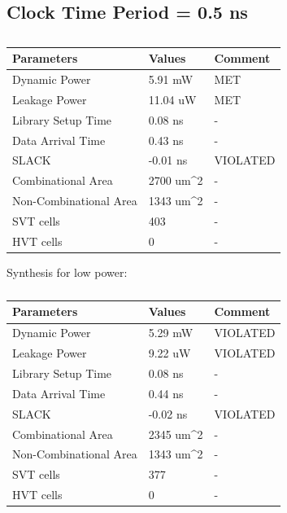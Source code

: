 \documentclass[11pt,a4paper]{article}
\begin{document}
\newpage
\subsection{Clock Time Period = 0.5 ns}
\begin{table}[htbp]
\begin{center}
\begin{tabular}{|l|l|l|}
\hline
\textbf{Parameters}	& \textbf{Values}		& \textbf{Comment}\\ \hline
Dynamic Power				&	5.91 mW				& MET\\ \hline
Leakage Power 			&	11.04 uW			& MET\\ \hline
Library Setup Time  & 0.08 ns				& - \\ \hline
Data Arrival Time		& 0.43 ns				& - \\ \hline
SLACK								& -0.01 ns			& VIOLATED \\ \hline
Combinational Area	& 2700 um^2			& - \\ \hline
Non-Combinational Area	& 1343 um^2	& - \\ \hline
SVT cells						& 403						& - \\ \hline
HVT cells						& 0							& - \\ \hline
\end{tabular}
\end{center}
\caption{}
\label{tab:syn0.5.1}
\end{table}

Synthesis for low power:

\begin{table}[htbp]
\begin{center}
\begin{tabular}{|l|l|l|}
\hline
\textbf{Parameters}	& \textbf{Values}		& \textbf{Comment}\\ \hline
Dynamic Power				&	5.29 mW				& VIOLATED\\ \hline
Leakage Power 			&	9.22 uW				& VIOLATED\\ \hline
Library Setup Time  & 0.08 ns				& - \\ \hline
Data Arrival Time		& 0.44 ns				& - \\ \hline
SLACK								& -0.02 ns			& VIOLATED \\ \hline
Combinational Area	& 2345 um^2			& - \\ \hline
Non-Combinational Area	& 1343 um^2	& - \\ \hline
SVT cells						& 377						& - \\ \hline
HVT cells						& 0							& - \\ \hline
\end{tabular}
\end{center}
\caption{}
\label{tab:syn0.5.2}
\end{table}
\end{document}
